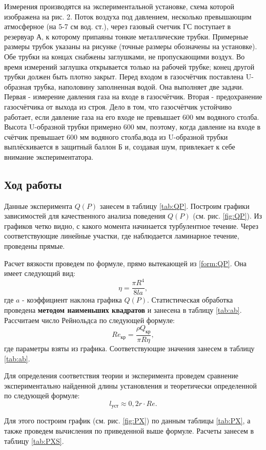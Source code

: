 \documentclass[12pt,a4paper]{article}
\begin{document}
	Измерения производятся на экспериментальной установке, схема которой изображена на рис. 2. Поток воздуха под давлением, несколько превышающим атмосферное (на 5-7 см вод. ст.), через газовый счетчик ГС поступает в резервуар А, к которому припаяны тонкие металлические трубки. Примерные размеры трубок указаны на рисунке (точные размеры обозначены на установке). Обе трубки на концах снабжены заглушками, не пропускающими воздух. Во время измерений заглушка открывается только на рабочей трубке; конец другой трубки должен быть плотно закрыт. Перед входом в газосчётчик поставлена U-образная трубка, наполовину заполненная водой. Она выполняет две задачи. Первая - измерение давления газа на входе в газосчётчик. Вторая - предохранение газосчётчика от выхода из строя. Дело в том, что газосчётчик устойчиво работает, если давление газа на его входе не превышает 600 мм водяного столба. Высота U-образной трубки примерно 600 мм, поэтому, когда давление на входе в счётчик превышает 600 мм водяного столба,вода из U-образной трубки выплёскивается в защитный баллон Б и, создавая шум, привлекает к себе внимание экспериментатора. 


\subsection*{Ход работы}



Данные эксперимента $Q(P)$ занесем в таблицу \ref{tab:QP}. Построим графики зависимостей для качественного анализа поведения $Q(P)$ (см. рис. \ref{fig:QP}).
Из графиков четко видно, с какого момента начинается турбулентное течение. Через соответствующие линейные участки, где наблюдается ламинарное течение, проведены прямые.

Расчет вязкости проведем по формуле, прямо вытекающей из \ref{form:QP}. Она имеет следующий вид:
$$\eta = \frac{\pi R^4}{8la},$$
где $a$ - коэффициент наклона графика $Q(P)$.
Статистическая обработка проведена \textbf{методом наименьших квадратов} и занесена в таблицу \ref{tab:ab}.
Рассчитаем число Рейнольдса по следующей формуле:
$$Re_{\text{кр}} = \frac{\rho Q_{\text{кр}}}{\pi R \eta},$$
где параметры взяты из графика. Соответствующие значения занесем в таблицу \ref{tab:ab}.

Для определения соответствия теории и эксперимента проведем сравнение экспериментально найденной длины установления и теоретически определенной по следующей формуле:
$$l_{\text{уст}} \approx  0,2 r \cdot Re.$$

Для этого построим график (см. рис. \ref{fig:PX}) по данным таблицы \ref{tab:PX}, а также проведем вычисления по приведенной выше формуле. Расчеты занесем в таблицу \ref{tab:PXS}.
\end{document}
